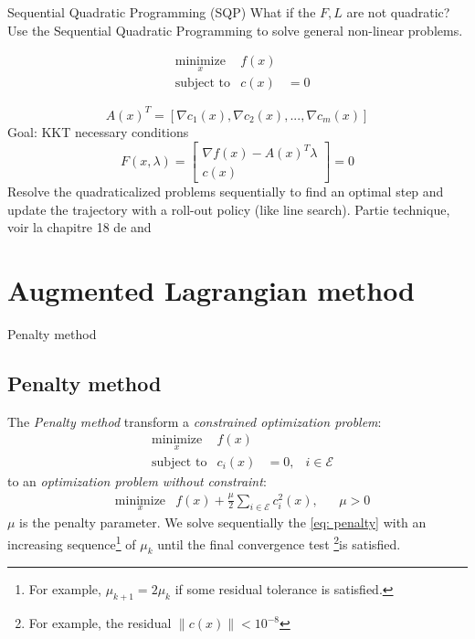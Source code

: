 \documentclass{beamer}
\begin{document}
\begin{frame}	{Sequential Quadratic Programming (SQP)}
What if the $F, L$ are not quadratic? Use the Sequential Quadratic Programming to solve general non-linear problems.

\begin{equation}
\begin{aligned}
&\underset{x}{\text{minimize}}       &f(x) &\\
&\text{subject to}       &c(x) &= 0
\end{aligned}
\end{equation}

\begin{equation}
A(x)^T = [\nabla c_1(x), \nabla c_2(x),..., \nabla c_m(x)]
\end{equation}
Goal: KKT necessary conditions
\begin{equation}
F(x, \lambda) = \begin{bmatrix}
\nabla f(x) - A(x)^T \lambda \\
c(x)
\end{bmatrix} = 0
\end{equation}
Resolve the quadraticalized problems sequentially to find an optimal step and update the trajectory with a roll-out policy (like line search). 
\color{gray} \quad Partie technique, voir la chapitre 18 de  \cite{NoceWrig06} and \cite{crocoddyl}
\end{frame}


\section{Augmented Lagrangian method}

\begin{frame}{Penalty method}
\subsection{Penalty method}
The \emph{Penalty method} transform a \emph{constrained optimization problem}:
\begin{equation}
\begin{aligned}	
&\underset{x}{\text{minimize}}                  &f(x) &  & \\
&\text{subject to}     & c_i(x)  &= 0,  & i \in \mathcal{E}
\end{aligned}
\end{equation}
to an \emph{optimization problem without constraint}:
\begin{equation}
\label{eq: penalty}
\begin{aligned}	
&\underset{x}{\text{minimize}}       &f(x) + \frac{\mu}{2} \sum_{i \in \mathcal{E}} c_i^2(x),&  &\mu >0
\end{aligned}
\end{equation}
$\mu$ is the penalty parameter. We solve sequentially the \ref{eq: penalty} with an increasing sequence\footnote{For example, $\mu_{k+1} = 2 \mu_k$ if some residual tolerance is satisfied.} of $\mu_k$ until the final convergence test \footnote{For example, the residual $\|c(x)\| < 10^{-8}$}is satisfied.

\end{frame}
\end{document}
